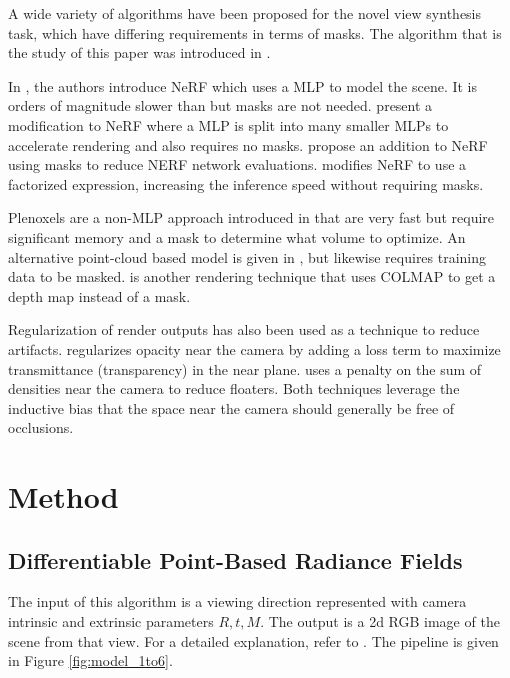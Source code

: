 \documentclass[10pt,twocolumn,letterpaper]{article}
\begin{document}

A wide variety of algorithms have been proposed for the novel view synthesis task, which have differing requirements in terms of masks. The algorithm that is the study of this paper was introduced in \cite{zhang2022differentiable}. 

In \cite{mildenhall2020nerf}, the authors introduce NeRF which uses a MLP to model the scene. It is orders of magnitude slower than \cite{zhang2022differentiable} but masks are not needed. \cite{reiser2021kilonerf} present a modification to NeRF where a MLP is split into many smaller MLPs to accelerate rendering and also requires no masks. \cite{kondo2021vaxnerf} propose an addition to NeRF using masks to reduce NERF network evaluations. \cite{Garbin21arxiv_FastNeRF} modifies NeRF to use a factorized expression, increasing the inference speed without requiring masks.

Plenoxels are a non-MLP approach introduced in \cite{yu_and_fridovichkeil2021plenoxels} that are very fast but require significant memory and a mask to determine what volume to optimize. An alternative point-cloud based model is given in \cite{Rakhimov_2022_CVPR}, but likewise requires training data to be masked. \cite{Lassner_2021_CVPR} is another rendering technique that uses COLMAP to get a depth map instead of a mask.

Regularization of render outputs has also been used as a technique to reduce artifacts. \cite{jain2022zeroshot} regularizes opacity near the camera by adding a loss term to maximize transmittance (\ie transparency) in the near plane. \cite{yang2023freenerf} uses a penalty on the sum of densities near the camera to reduce floaters. Both techniques leverage the inductive bias that the space near the camera should generally be free of occlusions.

\section{Method}


\subsection{Differentiable Point-Based Radiance Fields}

The input of this algorithm is a viewing direction represented with camera intrinsic and extrinsic parameters $R, t, M$. The output is a 2d RGB image of the scene from that view. For a detailed explanation, refer to \cite{zhang2022differentiable}. The pipeline is given in Figure \ref{fig:model_1to6}.
\end{document}
